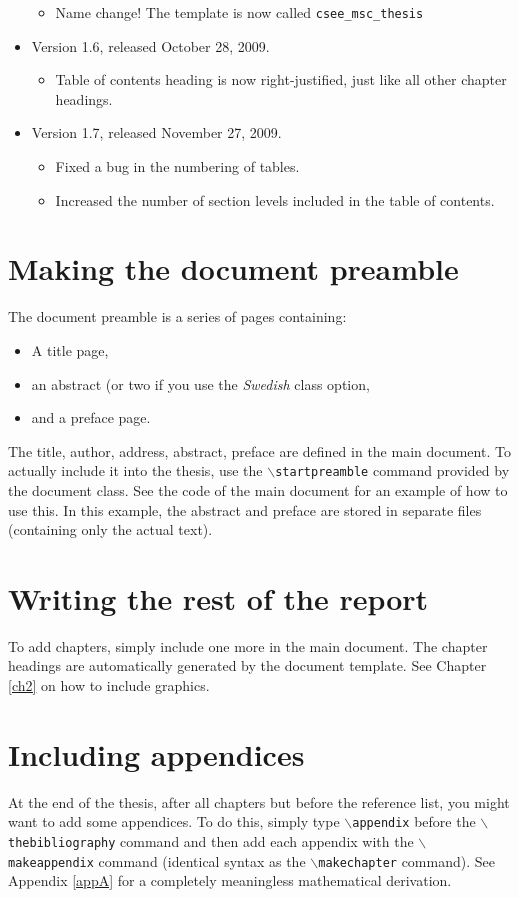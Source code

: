 \begin{itemize}
\begin{itemize}
        \item Name change! The template is now called \texttt{csee\_msc\_thesis}
	 \end{itemize}
	 \item Version 1.6, released October 28, 2009.
	 \begin{itemize}
			\item Table of contents heading is now right-justified, just like all other chapter headings.
	  \end{itemize}
	 \item Version 1.7, released November 27, 2009.
	 \begin{itemize}
	    \item Fixed a bug in the numbering of tables.
		 \item Increased the number of section levels included in the table of contents.
	 \end{itemize}
\end{itemize}

\section{Making the document preamble}
The document preamble is a series of pages containing:
\begin{itemize}
    \item A title page,
    \item an abstract (or two if you use the \textit{Swedish} class option,
    \item and a preface page.
\end{itemize}

The title, author, address, abstract, preface are defined in the
main document. To actually include it into the thesis, use the
\texttt{$\backslash$startpreamble} command provided by the
document class. See the code of the main document for an example
of how to use this. In this example, the abstract and preface are
stored in separate files (containing only the actual text).

\section{Writing the rest of the report}
To add chapters, simply include one more in the main document. The
chapter headings are automatically generated by the document
template. See Chapter \ref{ch2} on how to include graphics.

\section{Including appendices}
At the end of the thesis, after all chapters but before the
reference list, you might want to add some appendices. To do this,
simply type \texttt{$\backslash$appendix} before the
\texttt{$\backslash$thebibliography} command and then add each
appendix with the \texttt{$\backslash$makeappendix} command
(identical syntax as the \texttt{$\backslash$makechapter}
command). See Appendix \ref{appA} for a completely meaningless
mathematical derivation.

